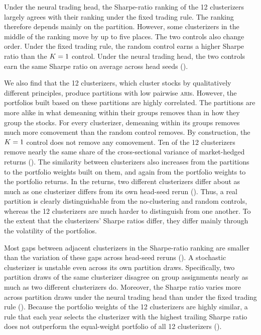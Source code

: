 Under the neural trading head, the Sharpe-ratio ranking of the 12 clusterizers largely agrees with their ranking under the fixed trading rule. The ranking therefore depends mainly on the partition. However, some clusterizers in the middle of the ranking move by up to five places. The two controls also change order. Under the fixed trading rule, the random control earns a higher Sharpe ratio than the $K=1$ control. Under the neural trading head, the two controls earn the same Sharpe ratio on average across head seeds ().

We also find that the 12 clusterizers, which cluster stocks by qualitatively different principles, produce partitions with low pairwise \textsc{ari}s. However, the portfolios built based on these partitions are highly correlated. The partitions are more alike in what demeaning within their groups removes than in how they group the stocks. For every clusterizer, demeaning within its groups removes much more comovement than the random control removes. By construction, the $K=1$ control does not remove any comovement. Ten of the 12 clusterizers remove nearly the same share of the cross-sectional variance of market-hedged returns
(). The similarity between clusterizers also increases from the partitions to the portfolio weights built on them, and again from the portfolio weights to the portfolio returns. In the returns, two different clusterizers differ
about as much as one clusterizer differs from its own head-seed rerun (). Thus, a real partition is clearly distinguishable from the no-clustering and random controls, whereas the 12 clusterizers are much harder to distinguish from one another. To the extent that the clusterizers' Sharpe ratios differ, they differ mainly through the volatility of the portfolios.

Most gaps between adjacent clusterizers in the Sharpe-ratio ranking are smaller than the variation of these gaps across head-seed reruns (). A stochastic clusterizer is unstable even across its own partition draws. Specifically, two partition draws of the same clusterizer disagree on group assignments nearly as much as two different clusterizers do. Moreover, the Sharpe ratio varies more across partition draws under the neural trading head than under the fixed trading rule (). Because the portfolio weights of the 12 clusterizers are highly similar, a rule that each year selects the clusterizer with the highest trailing Sharpe ratio does not outperform the equal-weight portfolio of all 12 clusterizers ().

